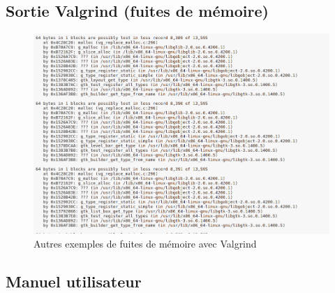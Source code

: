 \documentclass[12pt]{article}
\begin{document}
		\subsection{Sortie Valgrind (fuites de mémoire)}
		\begin{figure}[!h]
		\begin{center}
		\includegraphics[scale=.60]{autres_exemple_fuites_memoire.png}
		\caption{Autres exemples de fuites de mémoire avec Valgrind}
		\label{fig:autres_exemples_fuites_memoire}
		\end{center}
		\end{figure}
		
		\clearpage		
		
		\subsection{Manuel utilisateur}
 
\end{document}
